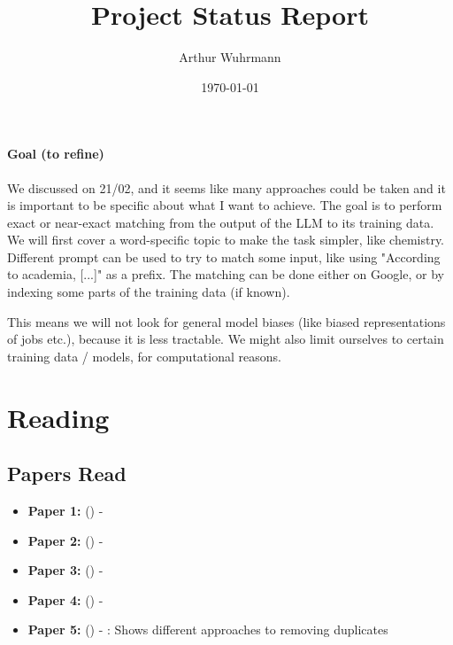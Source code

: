 \documentclass[a4paper,12pt]{article}
\title{\textbf{Project Status Report} \emoji{rocket}}
\author{Arthur Wuhrmann}
\date{\today}
\begin{document}
\maketitle

\paragraph{Goal (to refine)} We discussed on 21/02, and it seems like many approaches could be taken and it is important to be specific about what I want to achieve. 
The goal is to perform exact or near-exact matching from the output of the LLM to its training data. We will first cover a word-specific topic to make the task simpler, like chemistry. Different prompt can be used to try to match some input, like using "According to academia, [...]" as a prefix. The matching can be done either on Google, or by indexing some parts of the training data (if known). 

This means we will not look for general model biases (like biased representations of jobs etc.), because it is less tractable. We might also limit ourselves to certain training data / models, for computational reasons.

\section*{Reading }
\subsection*{Papers Read}
\begin{itemize}
    \item \textbf{Paper 1:} \citeauthor{bender_dangers_2021} (\citeyear{bender_dangers_2021}) - \textit{} 
        \item \textbf{Paper 2:} \citeauthor{elazar_whats_2024} (\citeyear{elazar_whats_2024}) - \textit{} 

    \item \textbf{Paper 3:} \citeauthor{marone_data_2023} (\citeyear{marone_data_2023}) - \textit{} 

    \item \textbf{Paper 4:} \citeauthor{mirzadeh_gsm-symbolic_2024} (\citeyear{mirzadeh_gsm-symbolic_2024}) - \textit{} 
    \item \textbf{Paper 5:} \citeauthor{lee_deduplicating_2022} (\citeyear{lee_deduplicating_2022}) - \textit{}: Shows different approaches to removing duplicates 

\end{itemize}
\end{document}
